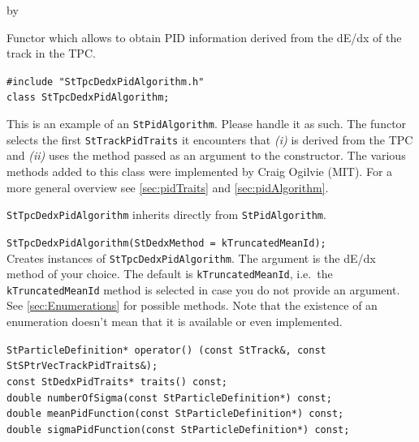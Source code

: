 \documentclass[twoside]{article}
\newcommand{\entrylabel}[1]{\mbox{\textbf{{#1}}}\hfil}%
\newenvironment{entry}
{\begin{list}{}%
    {\renewcommand{\makelabel}{\entrylabel}%
     \setlength{\labelwidth}{90pt}%
     \setlength{\leftmargin}{\labelwidth}
     \advance\leftmargin by \labelsep%
      }%
    }%
  {\end{list}}
\newcommand{\Entrylabel}[1]%
{\raisebox{0pt}[1ex][0pt]{\makebox[\labelwidth][l]%
    {\parbox[t]{\labelwidth}{\hspace{0pt}\textbf{{#1}}}}}}
\newenvironment{Entry}%
{\renewcommand{\entrylabel}{\Entrylabel}\begin{entry}}%
  {\end{entry}}
\begin{document}
\begin{Entry}
\item[Summary] Functor which allows to obtain PID information
    derived from the dE/dx of the track in the TPC.
\item[Synopsis]
    \verb+#include "StTpcDedxPidAlgorithm.h"+\\
    \verb+class StTpcDedxPidAlgorithm;+\\
    
\item[Description] This is an example of an \texttt{StPidAlgorithm}.
    Please handle it as such.  The functor selects the first
    \texttt{StTrackPidTraits} it encounters that \textit{(i)} is
    derived from the TPC and \textit{(ii)} uses the method passed as
    an argument to the constructor. The various methods added to this
    class were implemented by Craig Ogilvie (MIT).  For a more general
    overview see \ref{sec:pidTraits} and \ref{sec:pidAlgorithm}.
    
\item[Related Classes]
    \texttt{StTpcDedxPidAlgorithm} inherits directly from
    \texttt{StPidAlgorithm}.
    
\item[Public\\ Constructors]
    \verb+StTpcDedxPidAlgorithm(StDedxMethod = kTruncatedMeanId);+\\
    Creates instances of \texttt{StTpcDedxPidAlgorithm}. The argument
    is the dE/dx method of your choice. The default is
    \texttt{kTruncatedMeanId}, i.e.~the \texttt{kTruncatedMeanId}
    method is selected in case you do not provide an argument.  See
    \ref{sec:Enumerations} for possible methods. Note that the
    existence of an enumeration doesn't mean that it is available or
    even implemented.
    
\item[Public Member\\ Functions]
    \verb+StParticleDefinition* operator() (const StTrack&, const StSPtrVecTrackPidTraits&);+\\
    \verb+const StDedxPidTraits* traits() const;+\\
    \verb+double numberOfSigma(const StParticleDefinition*) const;+\\
    \verb+double meanPidFunction(const StParticleDefinition*) const;+\\
    \verb+double sigmaPidFunction(const StParticleDefinition*) const;+\\
\end{Entry}
\clearpage
\end{document}
